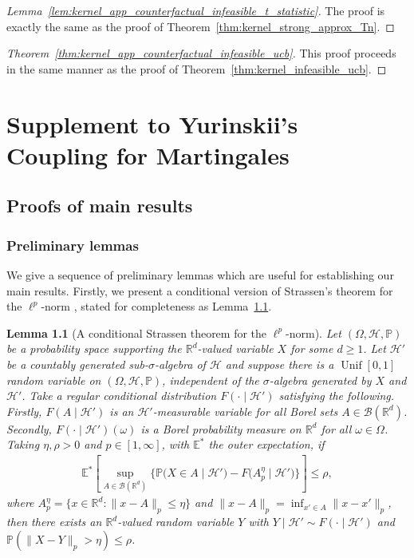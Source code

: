 \documentclass[11pt,lof]{puthesis}
\renewcommand{\P}{\ensuremath{\mathbb{P}}}
\newcommand{\R}{\ensuremath{\mathbb{R}}}
\newcommand{\E}{\ensuremath{\mathbb{E}}}
\newcommand{\cH}{\ensuremath{\mathcal{H}}}
\newcommand{\cB}{\ensuremath{\mathcal{B}}}
\DeclareMathOperator{\Unif}{Unif}
\theoremstyle{break}
\newtheorem{lemma}{Lemma}[section]
\theoremstyle{proof}
\newtheorem{proof}{Proof}
\begin{document}
\begin{proof}[Lemma~\ref{lem:kernel_app_counterfactual_infeasible_t_statistic}]
  The proof is exactly the same as the proof of
  Theorem~\ref{thm:kernel_strong_approx_Tn}.
\end{proof}

\begin{proof}[Theorem~\ref{thm:kernel_app_counterfactual_infeasible_ucb}]
  This proof proceeds in the same manner as the proof of
  Theorem~\ref{thm:kernel_infeasible_ucb}.
\end{proof}

\chapter[Supplement to Yurinskii's Coupling for Martingales]%
{Supplement to Yurinskii's \\ Coupling for Martingales}
\label{app:yurinskii}

\section{Proofs of main results}
\label{sec:yurinskii_app_proofs}

\subsection{Preliminary lemmas}

We give a sequence of preliminary lemmas which are useful for establishing our
main results. Firstly, we present a conditional version of Strassen's theorem
for the $\ell^p$-norm \citep[Theorem~B.2]{chen2020jackknife}, stated for
completeness as Lemma~\ref{lem:yurinskii_app_strassen}.

\begin{lemma}[A conditional Strassen theorem for the
  \texorpdfstring{$\ell^p$}{lp}-norm]%
  \label{lem:yurinskii_app_strassen}
  Let $(\Omega, \cH, \P)$ be a probability space supporting the $\R^d$-valued
  variable $X$ for some $d \geq 1$. Let $\cH'$ be a countably generated
  sub-$\sigma$-algebra of $\cH$ and suppose there is a $\Unif[0,1]$ random
  variable on $(\Omega, \cH, \P)$, independent of the $\sigma$-algebra
  generated by $X$ and $\cH'$. Take a regular conditional distribution
  $F(\cdot \mid \cH')$ satisfying the following. Firstly, $F(A \mid \cH')$ is
  an $\cH'$-measurable variable for all Borel sets $A \in \cB(\R^d)$.
  Secondly, $F(\cdot \mid \cH')(\omega)$ is a Borel probability measure on
  $\R^d$ for all $\omega \in \Omega$. Taking $\eta, \rho > 0$ and
  $p \in [1, \infty]$, with $\E^*$ the outer expectation, if
  \begin{align*}
    \E^* \left[
      \sup_{A \in \cB(\R^d)}
      \Big\{
        \P \big( X \in A \mid \cH' \big)
        - F \big( A_p^\eta \mid \cH' \big)
      \Big\}
    \right]
    \leq \rho,
  \end{align*}
  where $A_p^\eta = \{x \in \R^d : \|x - A\|_p \leq \eta\}$
  and $\|x - A\|_p = \inf_{x' \in A} \|x - x'\|_p$,
  then there exists an $\R^d$-valued random variable $Y$
  with $Y \mid \cH' \sim F(\cdot \mid \cH')$
  and $\P \left( \|X-Y\|_p > \eta \right) \leq \rho$.
\end{lemma}
\end{document}
